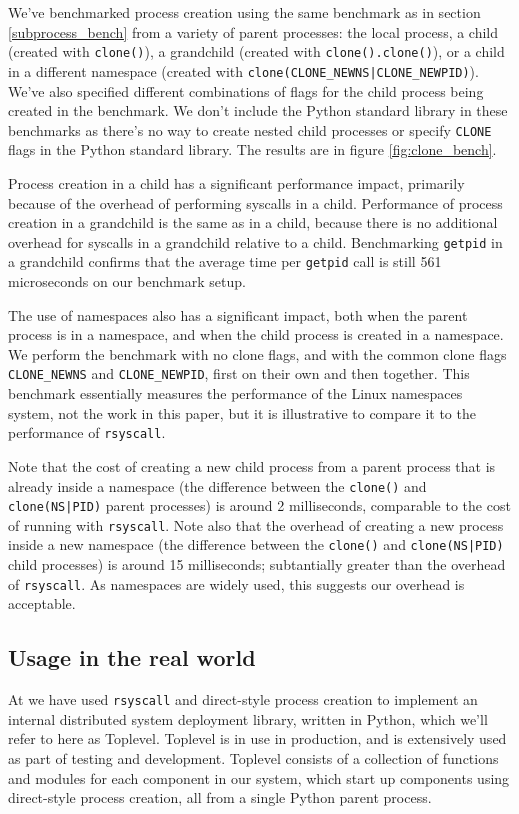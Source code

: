 \documentclass[letterpaper,twocolumn,10pt]{article}
\begin{document}
We've benchmarked process creation using the same benchmark as in section \ref{subprocess_bench}
from a variety of parent processes: the local process,
a child (created with \texttt{clone()}),
a grandchild (created with \texttt{clone().clone()}),
or a child in a different namespace (created with \verb=clone(CLONE_NEWNS|CLONE_NEWPID)=).
We've also specified different combinations of flags for the child process being created in the benchmark.
We don't include the Python standard library in these benchmarks
as there's no way to create nested child processes or specify \texttt{CLONE} flags in the Python standard library.
The results are in figure \ref{fig:clone_bench}.

Process creation in a child has a significant performance impact,
primarily because of the overhead of performing syscalls in a child.
Performance of process creation in a grandchild is the same as in a child,
because there is no additional overhead for syscalls in a grandchild relative to a child.
Benchmarking \texttt{getpid} in a grandchild
confirms that the average time per \texttt{getpid} call is still 561 microseconds on our benchmark setup.

The use of namespaces also has a significant impact,
both when the parent process is in a namespace, and when the child process is created in a namespace.
We perform the benchmark with no clone flags, and with the common clone flags
\verb|CLONE_NEWNS| and \verb|CLONE_NEWPID|, first on their own and then together.
This benchmark essentially measures the performance of the Linux namespaces system, not the work in this paper,
but it is illustrative to compare it to the performance of \texttt{rsyscall}.

Note that the cost of creating a new child process from a parent process that is already inside a namespace
(the difference between the \texttt{clone()} and \texttt{clone(NS|PID)} parent processes)
is around 2 milliseconds, comparable to the cost of running with \texttt{rsyscall}.
Note also that the overhead of creating a new process inside a new namespace
(the difference between the \texttt{clone()} and \texttt{clone(NS|PID)} child processes)
is around 15 milliseconds; subtantially greater than the overhead of \texttt{rsyscall}.
As namespaces are widely used,
this suggests our overhead is acceptable.
\subsection{Usage in the real world}\label{realworld}
At \twosigma we have used \texttt{rsyscall} and direct-style process creation
to implement an internal distributed system deployment library, written in Python,
which we'll refer to here as Toplevel.
Toplevel is in use in production,
and is extensively used as part of testing and development.
Toplevel consists of a collection of functions and modules
for each component in our system,
which start up components using direct-style process creation,
all from a single Python parent process.
\end{document}
